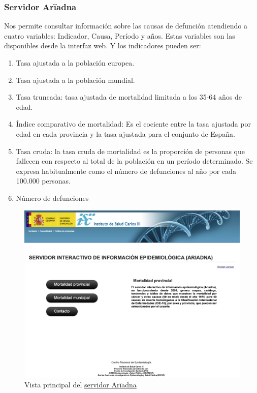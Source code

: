 \subsubsection{Servidor Arïadna}
Nos permite consultar información sobre las causas de defunción atendiendo a cuatro
variables: Indicador, Causa, Período y años. Estas variables son las disponibles desde la
interfaz web. Y los indicadores pueden ser:
\begin{enumerate}
  \item Tasa ajustada a la población europea.
  \item Tasa ajustada a la población mundial.
  \item Tasa truncada: tasa ajustada de mortalidad limitada a los 35-64 años de edad.
  \item Índice comparativo de mortalidad: Es el cociente entre la tasa ajustada por edad
  en cada provincia y la tasa ajustada para el conjunto de España.
  \item Tasa cruda: la tasa cruda de mortalidad es la proporción de personas que fallecen
  con respecto al total de la población en un período determinado. Se expresa
  habitualmente como el número de defunciones al año por cada 100.000 personas.
  \item Número de defunciones
\end{enumerate}
\FloatBarrier
\begin{figure}[]
	\centering
	\includegraphics[scale=0.3]{doc/logos/imgs/ariadna1.png}
	\caption{ Vista principal del \href{http://ariadna.cne.isciii.es/}{servidor Arïadna} }
    \label{fig:worst_f_value}
\end{figure}

